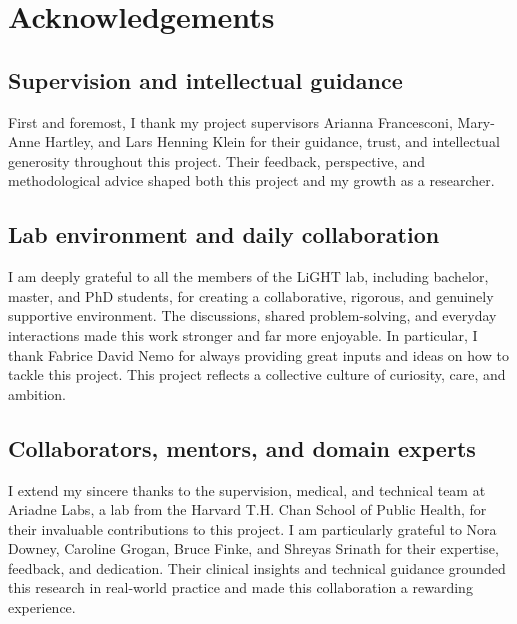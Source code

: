 \newpage
\section*{Acknowledgements}\label{sec:acknowledgements}

\subsection*{Supervision and intellectual guidance}

First and foremost, I thank my project supervisors Arianna Francesconi, Mary-Anne Hartley, and Lars Henning Klein for their guidance, trust, and intellectual generosity throughout this project. Their feedback, perspective, and methodological advice shaped both this project and my growth as a researcher.

\subsection*{Lab environment and daily collaboration}

I am deeply grateful to all the members of the LiGHT lab, including bachelor, master, and PhD students, for creating a collaborative, rigorous, and genuinely supportive environment. The discussions, shared problem-solving, and everyday interactions made this work stronger and far more enjoyable. In particular, I thank Fabrice David Nemo for always providing great inputs and ideas on how to tackle this project. This project reflects a collective culture of curiosity, care, and ambition.

\subsection*{Collaborators, mentors, and domain experts}

I extend my sincere thanks to the supervision, medical, and technical team at Ariadne Labs, a lab from the Harvard T.H. Chan School of Public Health, for their invaluable contributions to this project. I am particularly grateful to Nora Downey, Caroline Grogan, Bruce Finke, and Shreyas Srinath for their expertise, feedback, and dedication. Their clinical insights and technical guidance grounded this research in real-world practice and made this collaboration a rewarding experience.


